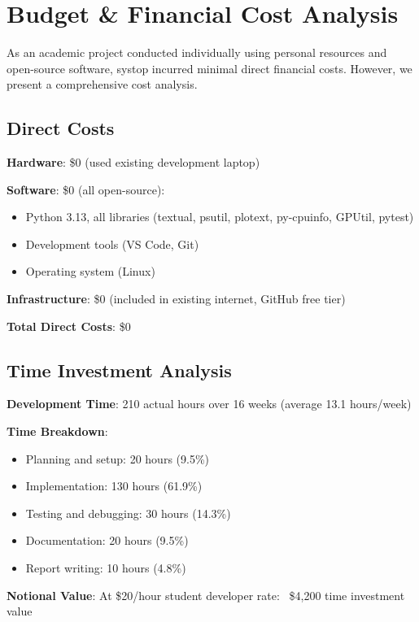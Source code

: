 \documentclass[12pt,a4paper,oneside]{report}
\begin{document}
\section{Budget \& Financial Cost Analysis}
\label{sec:budget}

As an academic project conducted individually using personal resources and open-source software, systop incurred minimal direct financial costs. However, we present a comprehensive cost analysis.

\subsection{Direct Costs}

\textbf{Hardware}: \$0 (used existing development laptop)

\textbf{Software}: \$0 (all open-source):
\begin{itemize}
    \item Python 3.13, all libraries (textual, psutil, plotext, py-cpuinfo, GPUtil, pytest)
    \item Development tools (VS Code, Git)
    \item Operating system (Linux)
\end{itemize}

\textbf{Infrastructure}: \$0 (included in existing internet, GitHub free tier)

\textbf{Total Direct Costs}: \$0

\subsection{Time Investment Analysis}

\textbf{Development Time}: 210 actual hours over 16 weeks (average 13.1 hours/week)

\textbf{Time Breakdown}:
\begin{itemize}
    \item Planning and setup: 20 hours (9.5\%)
    \item Implementation: 130 hours (61.9\%)
    \item Testing and debugging: 30 hours (14.3\%)
    \item Documentation: 20 hours (9.5\%)
    \item Report writing: 10 hours (4.8\%)
\end{itemize}

\textbf{Notional Value}: At \$20/hour student developer rate: ~\$4,200 time investment value
\end{document}
